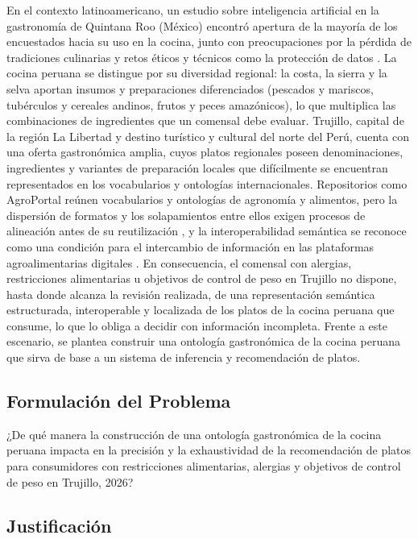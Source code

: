 \documentclass[conference]{IEEEtran}
\begin{document}
En el contexto latinoamericano, un estudio sobre inteligencia artificial en la gastronomía de Quintana Roo (México) encontró apertura de la mayoría de los encuestados hacia su uso en la cocina, junto con preocupaciones por la pérdida de tradiciones culinarias y retos éticos y técnicos como la protección de datos \cite{garcia2025}. La cocina peruana se distingue por su diversidad regional: la costa, la sierra y la selva aportan insumos y preparaciones diferenciados (pescados y mariscos, tubérculos y cereales andinos, frutos y peces amazónicos), lo que multiplica las combinaciones de ingredientes que un comensal debe evaluar. Trujillo, capital de la región La Libertad y destino turístico y cultural del norte del Perú, cuenta con una oferta gastronómica amplia, cuyos platos regionales poseen denominaciones, ingredientes y variantes de preparación locales que difícilmente se encuentran representados en los vocabularios y ontologías internacionales. Repositorios como AgroPortal reúnen vocabularios y ontologías de agronomía y alimentos, pero la dispersión de formatos y los solapamientos entre ellos exigen procesos de alineación antes de su reutilización \cite{jonquet2018}, y la interoperabilidad semántica se reconoce como una condición para el intercambio de información en las plataformas agroalimentarias digitales \cite{urdu2024}. En consecuencia, el comensal con alergias, restricciones alimentarias u objetivos de control de peso en Trujillo no dispone, hasta donde alcanza la revisión realizada, de una representación semántica estructurada, interoperable y localizada de los platos de la cocina peruana que consume, lo que lo obliga a decidir con información incompleta. Frente a este escenario, se plantea construir una ontología gastronómica de la cocina peruana que sirva de base a un sistema de inferencia y recomendación de platos.

\subsection{Formulación del Problema}

¿De qué manera la construcción de una ontología gastronómica de la cocina peruana impacta en la precisión y la exhaustividad de la recomendación de platos para consumidores con restricciones alimentarias, alergias y objetivos de control de peso en Trujillo, 2026?

\subsection{Justificación}
\end{document}
